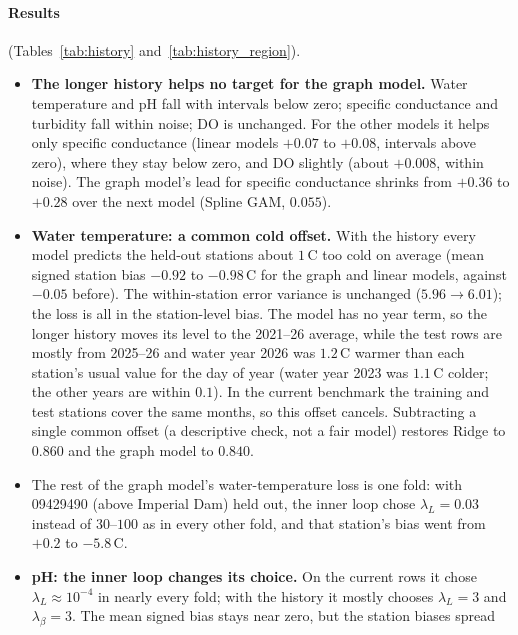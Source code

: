 \documentclass[11pt]{article}
\begin{document}
\paragraph{Results} (Tables~\ref{tab:history} and~\ref{tab:history_region}).
\begin{itemize}
  \item \textbf{The longer history helps no target for the graph model.} Water temperature and pH
        fall with intervals below zero; specific conductance and turbidity fall within noise; DO is
        unchanged. For the other models it helps only specific conductance (linear models $+0.07$
        to $+0.08$, intervals above zero), where they stay below zero, and DO slightly (about
        $+0.008$, within noise). The graph model's lead for specific conductance shrinks from $+0.36$
        to $+0.28$ over the next model (Spline GAM, $0.055$).
  \item \textbf{Water temperature: a common cold offset.} With the history every model predicts the
        held-out stations about $1$\,\textdegree C too cold on average (mean signed station bias
        $-0.92$ to $-0.98$\,\textdegree C for the graph and linear models, against $-0.05$ before).
        The within-station error variance is unchanged ($5.96\to6.01$); the loss is all in the
        station-level bias. The model has no year term, so the longer history moves its level to
        the 2021--26 average, while the test rows are mostly from 2025--26 and water year 2026 was
        $1.2$\,\textdegree C warmer than each station's usual value for the day of year (water year
        2023 was $1.1$\,\textdegree C colder; the other years are within $0.1$). In the current
        benchmark the training and test stations cover the same months, so this offset cancels.
        Subtracting a single common offset (a descriptive check, not a fair model) restores Ridge
        to $0.860$ and the graph model to $0.840$.
  \item The rest of the graph model's water-temperature loss is one fold: with 09429490 (above
        Imperial Dam) held out, the inner loop chose $\lambda_L=0.03$ instead of $30$--$100$ as in
        every other fold, and that station's bias went from $+0.2$ to $-5.8$\,\textdegree C.
  \item \textbf{pH: the inner loop changes its choice.} On the current rows it chose $\lambda_L
        \approx 10^{-4}$ in nearly every fold; with the history it mostly chooses $\lambda_L=3$ and
        $\lambda_\beta=3$. The mean signed bias stays near zero, but the station biases spread

\end{itemize}
\end{document}
